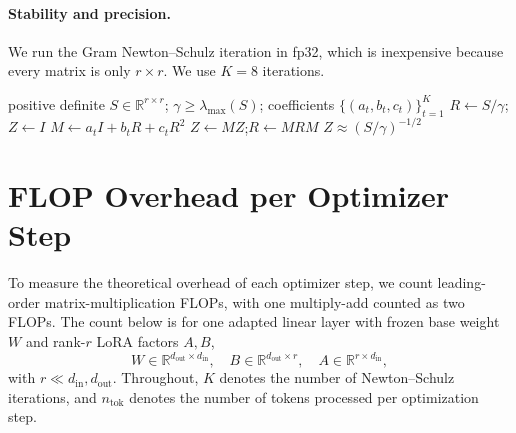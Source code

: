 \documentclass[11pt]{article}
\theoremstyle{plain}
\theoremstyle{definition}
\theoremstyle{remark}
\theoremstyle{definition}
\begin{document}
\paragraph{Stability and precision.}
We run the Gram Newton--Schulz iteration in fp32, which is inexpensive because
every matrix is only $r\times r$.  We use $K=8$ iterations.


\begin{algorithm}[ht]
\caption{Gram Newton--Schulz iteration}
\label{alg:gramns}
\begin{algorithmic}[1]
\Require positive definite $S \in \mathbb{R}^{r \times r}$; $\gamma \ge \lambda_{\max}(S)$; coefficients $\{(a_t,b_t,c_t)\}_{t=1}^{K}$
\Statex\vspace{-0.5\baselineskip}
\State $R\gets S/\gamma$;\quad $Z\gets I$ 
  \State $M\gets a_t I+b_t R+c_t R^2$
  \State $Z\gets M Z$;\quad $R\gets M R M$
\EndFor
\State \Return $Z\approx (S/\gamma)^{-1/2}$
\end{algorithmic}
\end{algorithm}







\section{FLOP Overhead per Optimizer Step}
\label{app:flops}
To measure the theoretical overhead of each optimizer step, we count
leading-order matrix-multiplication FLOPs, with one multiply-add counted as two
FLOPs.  The count below is for one
adapted linear layer with frozen base weight $W$ and rank-$r$ LoRA factors
$A,B$,
\[
  W\in\mathbb{R}^{d_{\mathrm{out}}\times d_{\mathrm{in}}},\quad
  B\in\mathbb{R}^{d_{\mathrm{out}}\times r},\quad
  A\in\mathbb{R}^{r\times d_{\mathrm{in}}},
\]
with $r\ll d_{\mathrm{in}},d_{\mathrm{out}}$.  Throughout, $K$ denotes the number
of Newton--Schulz iterations, and $n_{\mathrm{tok}}$ denotes the number of tokens
processed per optimization step.
\end{document}
